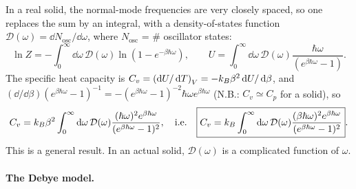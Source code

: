 In a real solid, the normal-mode frequencies are very closely spaced, so one replaces the sum by an integral, with a density-of-states
function $\mathcal D(\omega) = \dd N_{\text{osc}}/\dd\omega$, where $N_{\text{osc}}$ = \# oscillator states:
\begin{equation}
  \ln Z = -\int_0^\infty\dd\omega\,\mathcal D(\omega)\ln(1-e^{-\beta\hbar\omega}),\qquad
  U = \int_0^\infty\dd\omega\,\mathcal D(\omega)\frac{\hbar\omega}{(e^{\beta\hbar\omega}-1)}.
\end{equation}
The specific heat capacity is $C_v = \left(\mathop{}\!\mathrm{d} U/\mathop{}\!\mathrm{d} T\right)_V = -k_{B}\beta^2\mathop{}\!\mathrm{d} U/\mathop{}\!\mathrm{d}\beta$, and
$(\dd/\dd\beta)(e^{\beta\hbar\omega}-1)^{-1} = -(e^{\beta\hbar\omega}-1)^{-2}\hbar\omega e^{\beta\hbar\omega}$ (N.B.:
$C_v\simeq C_p$ for a solid), so
\begin{equation}
  C_v = k_{B}\beta^2\int_0^\infty\mathop{}\!\mathrm{d}\omega\,\mathcal D(\omega)\frac{(\hbar\omega)^2e^{\beta\hbar\omega}}{(e^{\beta\hbar\omega}-1)^2},
  \quad\text{i.e.}\quad
  \boxed{C_v = k_{B}\int_0^\infty\mathop{}\!\mathrm{d}\omega\,\mathcal D(\omega)\frac{(\beta\hbar\omega)^2e^{\beta\hbar\omega}}{(e^{\beta\hbar\omega}-1)^2}}.
\end{equation}
This is a general result. In an actual solid, $\mathcal D(\omega)$ is a complicated function of $\omega$.

\paragraph{The Debye model.}

